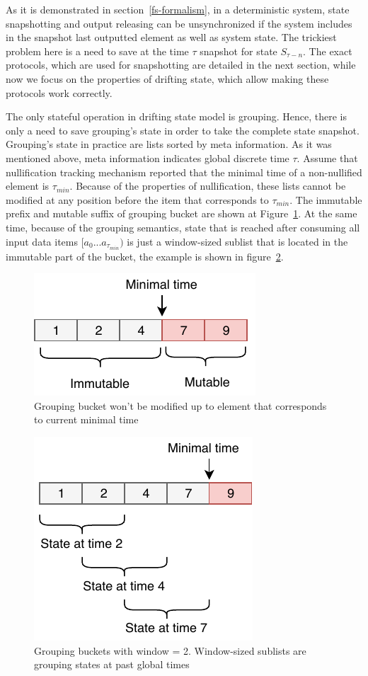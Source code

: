 As it is demonstrated in section~\ref{fs-formalism}, in a deterministic system, state snapshotting and output releasing can be unsynchronized if the system includes in the snapshot last outputted element as well as system state. The trickiest problem here is a need to save at the time $\tau$ snapshot for state $S_{\tau-n}$. The exact protocols, which are used for snapshotting are detailed in the next section, while now we focus on the properties of drifting state, which allow making these protocols work correctly. 

The only stateful operation in drifting state model is grouping. Hence, there is only a need to save grouping's state in order to take the complete state snapshot. Grouping's state in practice are lists sorted by meta information. As it was mentioned above, meta information indicates global discrete time $\tau$. Assume that nullification tracking mechanism reported that the minimal time of a non-nullified element is $\tau_{min}$. Because of the properties of nullification, these lists cannot be modified at any position before the item that corresponds to $\tau_{min}$. The immutable prefix and mutable suffix of grouping bucket are shown at Figure~\ref{immutable}. At the same time, because of the grouping semantics, state that is reached after consuming all input data items $[a_{0}...a_{\tau_{min}})$ is just a window-sized sublist that is located in the immutable part of the bucket, the example is shown in figure~\ref{substate}. 

\begin{figure}[htbp]
  \centering
  \includegraphics[width=.3\textwidth]{pics/immutable}
  \caption{Grouping bucket won't be modified up to element that corresponds to current minimal time}
  \label {immutable}
\end{figure}

\begin{figure}[htbp]
  \centering
  \includegraphics[width=.3\textwidth]{pics/substate}
  \caption{Grouping buckets with window = 2. Window-sized sublists are grouping states at past global times}
  \label {substate}
\end{figure}

